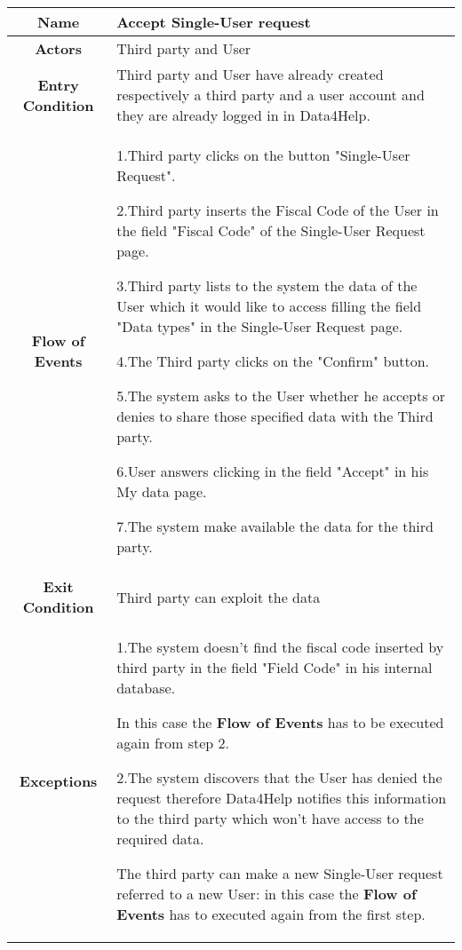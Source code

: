       \begin{table}[h!]
        \centering
        \begin{tabularx}{\linewidth}{|c|X|}
          \hline

          \textbf{Name} & Accept Single-User request\\
        	\hline

        	\textbf{Actors} & Third party and User \\
        	\hline

        	\textbf{Entry Condition} & Third party and User have already created respectively a third party and a user account and they 							are already logged in in Data4Help.\\
        	\hline

        	\textbf{Flow of Events} & 1.Third party clicks on the button "Single-User Request".

        					2.Third party inserts the Fiscal Code of the User in the field "Fiscal Code" of the Single-User 							Request page.

        					3.Third party lists to the system the data of the User which it would like to access filling the field 						"Data types" in the Single-User Request page.

					4.The Third party clicks on the "Confirm" button.

        					5.The system asks to the User whether he accepts or denies to share those specified data with 						the Third party.

        					6.User answers clicking in the field "Accept" in his My data page.

        					7.The system make available the data for the third party.\\
        	\hline

        	\textbf{Exit Condition} & Third party can exploit the data \\
        	\hline

        	\textbf{Exceptions} & 1.The system doesn't find the fiscal code inserted by third party in the field "Field Code" in his 						internal database.

        				In this case the \textbf{Flow of Events} has to be executed again from step 2.

        				2.The system discovers that the User has denied the request therefore Data4Help notifies this 						information to the third party which won't have access to the required data.

        				The third party can 	make a new Single-User request referred to a new User: in this case the 							\textbf{Flow of Events} has to executed again from the first step.\\

         
 \hline
        
\end{tabularx}

      \end{table}


